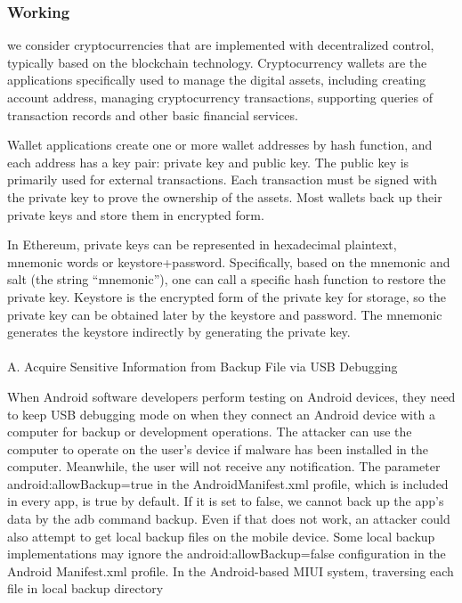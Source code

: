 \documentclass[12pt]{article}
\begin{document}
\newpage
\subsubsection{Working}

\par we consider cryptocurrencies that are implemented with decentralized control, typically based on
the blockchain technology. Cryptocurrency wallets are the
applications specifically used to manage the digital assets,
including creating account address, managing cryptocurrency
transactions, supporting queries of transaction records and
other basic financial services.\par
Wallet applications create one or more wallet addresses
by hash function, and each address has a key pair: private
key and public key. The public key is primarily used for
external transactions. Each transaction must be signed with
the private key to prove the ownership of the assets. Most
wallets back up their private keys and store them in encrypted
form. \par In Ethereum, private keys can be represented in hexadecimal plaintext, mnemonic words or keystore+password.
Specifically, based on the mnemonic and salt (the string
“mnemonic”), one can call a specific hash function to restore
the private key. Keystore is the encrypted form of the private
key for storage, so the private key can be obtained later by the
keystore and password. The mnemonic generates the keystore
indirectly by generating the private key.
\\
\\
A. Acquire Sensitive Information from Backup File via USB
Debugging 
\par
When Android software developers perform testing on
Android devices, they need to keep USB debugging mode on
when they connect an Android device with a computer for
backup or development operations. The attacker can use the
computer to operate on the user’s device if malware has been
installed in the computer. Meanwhile, the user will not receive
any notification. The parameter android:allowBackup=true in
the AndroidManifest.xml profile, which is included in every
app, is true by default. If it is set to false, we cannot back up
the app’s data by the adb command backup. Even if that does
not work, an attacker could also attempt to get local backup
files on the mobile device. Some local backup implementations may ignore the android:allowBackup=false configuration in the Android Manifest.xml profile. In the Android-based
MIUI system, traversing each file in local backup directory
\end{document}
